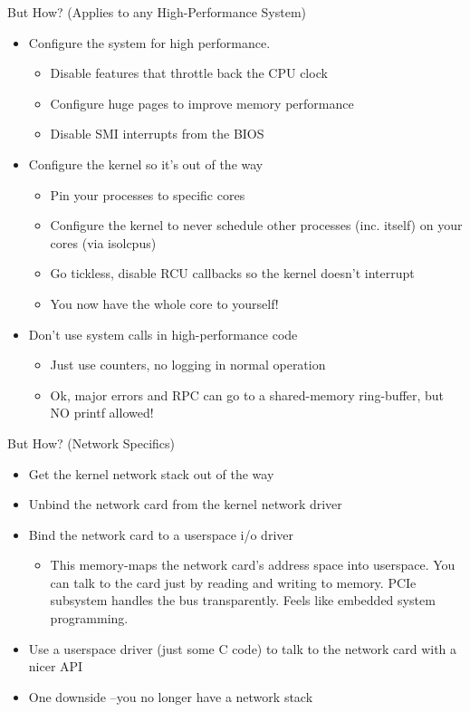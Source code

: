 \documentclass[presentation]{beamer}
\begin{document}
\begin{frame}[label={sec:org1f777c2}]{But How? (Applies to any High-Performance System)}
\begin{itemize}
\item Configure the system for high performance.
\begin{itemize}
\item Disable features that throttle back the CPU clock
\item Configure huge pages to improve memory performance
\item Disable SMI interrupts from the BIOS
\end{itemize}
\item Configure the kernel so it's out of the way
\begin{itemize}
\item Pin your processes to specific cores
\item Configure the kernel to never schedule other processes (inc.
itself) on your cores (via isolcpus)
\item Go tickless, disable RCU callbacks so the kernel doesn't interrupt
\item You now have the whole core to yourself!
\end{itemize}
\item Don't use system calls in high-performance code
\begin{itemize}
\item Just use counters, no logging in normal operation
\item Ok, major errors and RPC can go to a shared-memory ring-buffer,
but NO printf allowed!
\end{itemize}
\end{itemize}
\end{frame}
\begin{frame}[label={sec:org6ac71fd}]{But How? (Network Specifics)}
\begin{itemize}
\item Get the kernel network stack out of the way
\item Unbind the network card from the kernel network driver
\item Bind the network card to a userspace i/o driver
\begin{itemize}
\item This memory-maps the network card's address space into
userspace. You can talk to the card just by reading and writing
to memory. PCIe subsystem handles the bus transparently. Feels
like embedded system programming.
\end{itemize}
\item Use a userspace driver (just some C code) to talk to the network
card with a nicer API
\item One downside --you no longer have a network stack
\end{itemize}
\end{frame}
\end{document}
